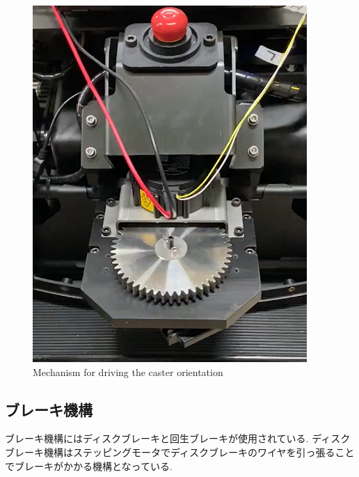 \begin{figure}[H]
  \centering
 \includegraphics[keepaspectratio, scale=0.5]
      {images/caster.png}
 \caption{Mechanism for driving the caster orientation}
 \label{fig:Mechanism for driving the caster orientation}
\end{figure}

\subsection{ブレーキ機構}
ブレーキ機構にはディスクブレーキと回生ブレーキが使用されている.
ディスクブレーキ機構はステッピングモータでディスクブレーキのワイヤを引っ張ることでブレーキがかかる機構となっている.


